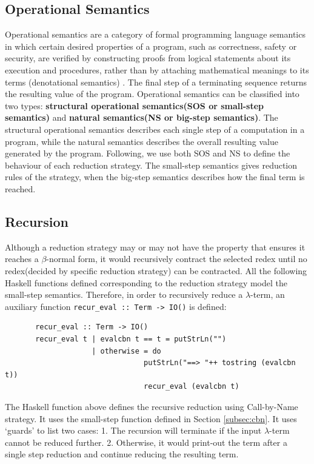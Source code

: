 \subsection*{Operational Semantics}

Operational semantics are a category of formal programming language semantics in which certain desired properties of a program, such as correctness, safety or security, are verified by constructing proofs from logical statements about its execution and procedures, rather than by attaching mathematical meanings to its terms (denotational semantics) \cite{operational}. The final step of a terminating sequence returns the resulting value of the program. Operational semantics can be classified into two types: \textbf{structural operational semantics(SOS or small-step semantics)} and \textbf{natural semantics(NS or big-step semantics)}. The structural operational semantics describes each single step of a computation in a program, while the natural semantics describes the overall resulting value generated by the program. Following, we use both SOS and NS to define the behaviour of each reduction strategy. The small-step semantics gives reduction rules of the strategy, when the big-step semantics describes how the final term is reached.  

\subsection*{Recursion}

Although a reduction strategy may or may not have the property that ensures it reaches a $\beta$-normal form, it would recursively contract the selected redex until no redex(decided by specific reduction strategy) can be contracted. All the following Haskell functions defined corresponding to the reduction strategy model the small-step semantics. Therefore, in order to recursively reduce a $\lambda$-term, an auxiliary function \verb|recur_eval :: Term -> IO()| is defined:

\begin{verbatim}
       recur_eval :: Term -> IO()
       recur_eval t | evalcbn t == t = putStrLn("")
                    | otherwise = do
                                putStrLn("==> "++ tostring (evalcbn t))
                                recur_eval (evalcbn t)
\end{verbatim}

The Haskell function above defines the recursive reduction using Call-by-Name strategy. It uses the small-step function defined in Section \ref{subsec:cbn}. It uses `guards' to list two cases: 1. The recursion will terminate if the input $\lambda$-term cannot be reduced further. 2. Otherwise, it would print-out the term after a single step reduction and continue reducing the resulting term.



